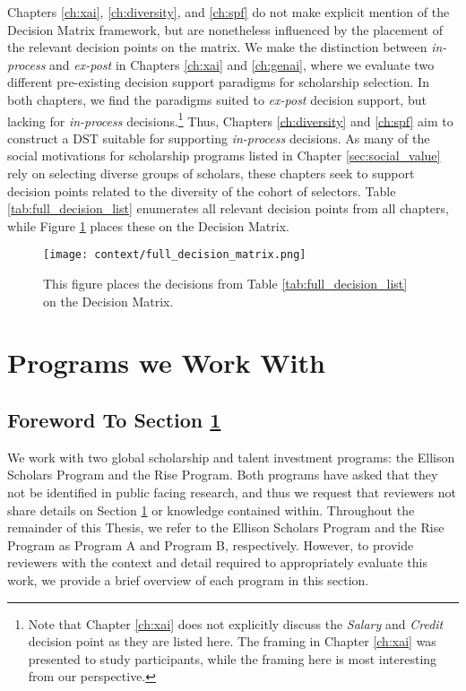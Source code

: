 Chapters \ref{ch:xai}, \ref{ch:diversity}, and \ref{ch:spf} do not make explicit mention of the Decision Matrix framework, but are nonetheless influenced by the placement of the relevant decision points on the matrix. We make the distinction between \emph{in-process} and \emph{ex-post} in Chapters \ref{ch:xai} and \ref{ch:genai}, where we evaluate two different pre-existing decision support paradigms for scholarship selection. In both chapters, we find the paradigms suited to \emph{ex-post} decision support, but lacking for \emph{in-process} decisions.\footnote{Note that Chapter \ref{ch:xai} does not explicitly discuss the \emph{Salary} and \emph{Credit} decision point as they are listed here. The framing in Chapter \ref{ch:xai} was presented to study participants, while the framing here is most interesting from our perspective.} Thus, Chapters \ref{ch:diversity} and \ref{ch:spf} aim to construct a DST suitable for supporting \emph{in-process} decisions. As many of the social motivations for scholarship programs listed in Chapter \ref{sec:social_value} rely on selecting diverse groups of scholars, these chapters seek to support decision points related to the diversity of the cohort of selectors. Table \ref{tab:full_decision_list} enumerates all relevant decision points from all chapters, while Figure \ref{fig:full_decision_matrix} places these on the Decision Matrix.

\begin{figure}[htbp]
  \centering
  \texttt{[image: context/full\_decision\_matrix.png]}
  \caption{This figure places the decisions from Table \ref{tab:full_decision_list} on the Decision Matrix.}
  \label{fig:full_decision_matrix}
\end{figure}

\section{Programs we Work With}\label{sec:programs}
\subsection{Foreword To Section \ref{sec:programs}}
We work with two global scholarship and talent investment programs: the Ellison Scholars Program and the Rise Program. Both programs have asked that they not be identified in public facing research, and thus we request that reviewers not share details on Section \ref{sec:programs} or knowledge contained within. Throughout the remainder of this Thesis, we refer to the Ellison Scholars Program and the Rise Program as Program A and Program B, respectively. However, to provide reviewers with the context and detail required to appropriately evaluate this work, we provide a brief overview of each program in this section.

